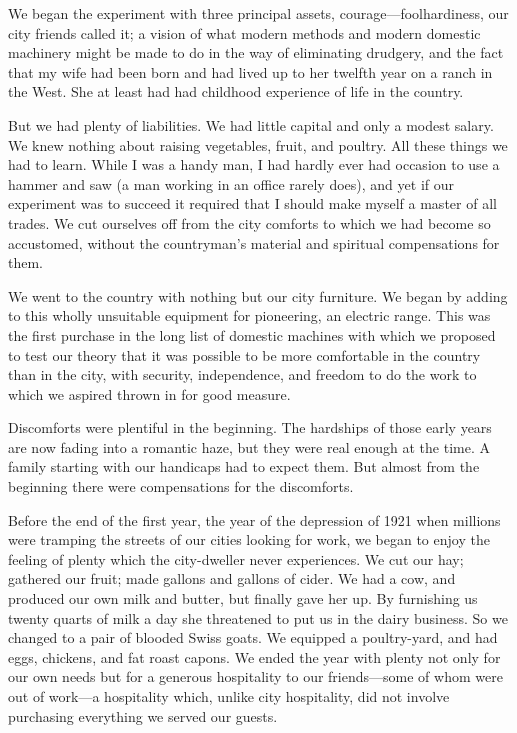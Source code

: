 \documentclass{book}
\begin{document}
We began the experiment with three principal assets, courage—foolhardiness, our city friends called it; a vision of what modern methods and modern domestic machinery might be made to do in the way of eliminating drudgery, and the fact that my wife had been born and had lived up to her twelfth year on a ranch in the West. She at least had had childhood experience of life in the country.

But we had plenty of liabilities. We had little capital and only a modest salary. We knew nothing about raising vegetables, fruit, and poultry. All these things we had to learn. While I was a handy man, I had hardly ever had occasion to use a hammer and saw (a man working in an office rarely does), and yet if our experiment was to succeed it required that I should make myself a master of all trades. We cut ourselves off from the city comforts to which we had become so accustomed, without the countryman’s material and spiritual compensations for them.

We went to the country with nothing but our city furniture. We began by adding to this wholly unsuitable equipment for pioneering, an electric range. This was the first purchase in the long list of domestic machines with which we proposed to test our theory that it was possible to be more comfortable in the country than in the city, with security, independence, and freedom to do the work to which we aspired thrown in for good measure.

Discomforts were plentiful in the beginning. The hardships of those early years are now fading into a romantic haze, but they were real enough at the time. A family starting with our handicaps had to expect them. But almost from the beginning there were compensations for the discomforts.

Before the end of the first year, the year of the depression of 1921 when millions were tramping the streets of our cities looking for work, we began to enjoy the feeling of plenty which the city-dweller never experiences. We cut our hay; gathered our fruit; made gallons and gallons of cider. We had a cow, and produced our own milk and butter, but finally gave her up. By furnishing us twenty quarts of milk a day she threatened to put us in the dairy business. So we changed to a pair of blooded Swiss goats. We equipped a poultry-yard, and had eggs, chickens, and fat roast capons. We ended the year with plenty not only for our own needs but for a generous hospitality to our friends—some of whom were out of work—a hospitality which, unlike city hospitality, did not involve purchasing everything we served our guests.
\end{document}
